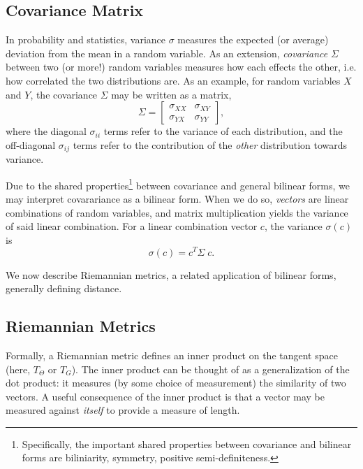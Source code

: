 \documentclass[10pt,conference]{ieeeconf}
\begin{document}
\subsection{Covariance Matrix}
In probability and statistics, variance $\sigma$ measures the expected (or average) deviation from the mean in a random variable.
As an extension, \textit{covariance} $\Sigma$ between two (or more!) random variables measures how each effects the other, i.e. how correlated the two distributions are.
As an example, for random variables $X$ and $Y$, the covariance $\Sigma$ may be written as a matrix,
\begin{equation}
    \Sigma =
    \begin{bmatrix}
        \sigma_{XX} & \sigma_{XY} \\
        \sigma_{YX} & \sigma_{YY}
    \end{bmatrix},
\end{equation}
where the diagonal $\sigma_{ii}$ terms refer to the variance of each distribution, and the off-diagonal $\sigma_{ij}$ terms refer to the contribution of the \textit{other} distribution towards variance.

Due to the shared properties\footnote{
    Specifically, the important shared properties between covariance and bilinear forms are biliniarity, symmetry, positive semi-definiteness.
} between covariance and general bilinear forms, we may interpret covarariance as a bilinear form.
When we do so, \textit{vectors} are linear combinations of random variables, and matrix multiplication yields the variance of said linear combination.
For a linear combination vector $c$, the variance $\sigma(c)$ is
\begin{equation}
    \sigma(c) = c^T \Sigma \; c.
\end{equation}

We now describe Riemannian metrics, a related application of bilinear forms, generally defining distance.

\subsection{Riemannian Metrics}
Formally, a Riemannian metric defines an inner product on the tangent space (here, $T_\Theta$ or $T_G$).
The inner product can be thought of as a generalization of the dot product: it measures (by some choice of measurement) the similarity of two vectors.
A useful consequence of the inner product is that a vector may be measured against \textit{itself} to provide a measure of length.
\end{document}

